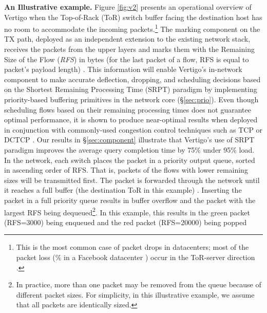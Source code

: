\textbf{An Illustrative example.} Figure \ref{fig:v2} presents an operational overview of Vertigo when the Top-of-Rack (ToR) switch buffer facing the destination host has no room to accommodate the incoming packets.\footnote{This is the most common case of packet drops in datacenters; most of the packet loss (\% in a Facebook datacenter \cite{high-resolution}) occur in the ToR-server direction \cite{jupiter, high-resolution}.} The marking component on the TX path, deployed as an independent extension to the existing network stack, receives the packets from the upper layers  and marks them with the Remaining Size of the Flow (\emph{RFS}) in bytes (\eg for the last packet of a flow, RFS is equal to packet's payload length)  . 
This information will enable Vertigo's in-network component to make accurate deflection, dropping, and scheduling decisions based on the Shortest Remaining Processing Time (SRPT) paradigm \cite{pfabric} by implementing priority-based buffering primitives in the network core (\S\ref{sec:prio}). Even though scheduling flows based on their remaining processing times does not guarantee optimal performance, it is shown to produce near-optimal results when deployed in conjunction with commonly-used congestion control techniques such as TCP or DCTCP \cite{essential,pfabric}. Our results in \S\ref{sec:component} illustrate that Vertigo's use of SRPT paradigm improves the average query completion time by 75\% under 95\% load.
In the network, each switch places the packet in a priority output queue, sorted in ascending order of RFS. That is, packets of the flows with lower remaining sizes will be transmitted first. The packet is forwarded through the network until it reaches a full buffer (the destination ToR in this example) . Inserting the packet in a full priority queue results in buffer overflow and the packet with the largest RFS being dequeued\footnote{In practice, more than one packet may be removed from the queue because of different packet sizes. For simplicity, in this illustrative example, we assume that all packets are identically sized.}. In this example, this results in the green packet (RFS=3000) being enqueued  and the red packet (RFS=20000) being popped
